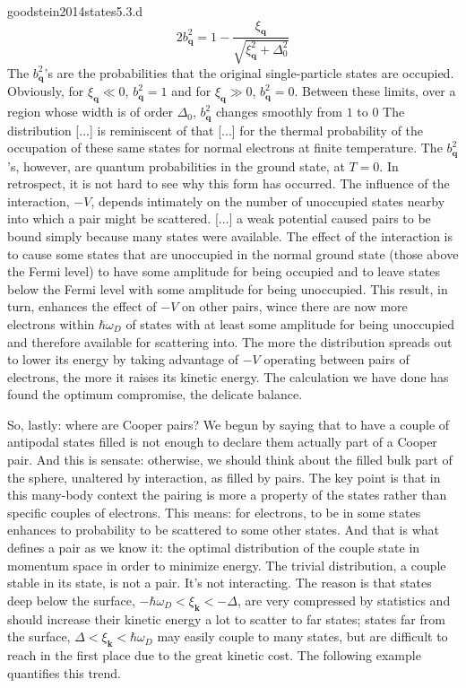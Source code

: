 \begin{cit}{goodstein2014states}{5.3.d}
	\[
	2 b_\mathbf{q}^2 = 1 - \frac{\xi_\mathbf{q}}{\sqrt{\xi_\mathbf{q}^2 + \Delta_0^2}}
	\]
	The $b_\mathbf{q}^2$'s are the probabilities that the original single-particle states are occupied. Obviously, for $\xi_\mathbf{q} \ll 0$, $b_\mathbf{q}^2 = 1$ and for $\xi_\mathbf{q} \gg 0$, $b_\mathbf{q}^2 = 0$. Between these limits, over a region whose width is of order $\Delta_0$, $b_\mathbf{q}^2$ changes smoothly from $1$ to $0$ The distribution [...] is reminiscent of that [...] for the thermal probability of the occupation of these same states for normal electrons at finite temperature. The $b_\mathbf{q}^2$'s, however, are quantum probabilities in the ground state, at $T=0$. In retrospect, it is not hard to see why this form has occurred. The influence of the interaction, $-V$, depends intimately on the number of unoccupied states nearby into which a pair might be scattered. [...] a weak potential caused pairs to be bound simply because many states were available. The effect of the interaction is to cause some states that are unoccupied in the normal ground state (those above the Fermi level) to have some amplitude for being occupied and to leave states below the Fermi level with some amplitude for being unoccupied. This result, in turn, enhances the effect of $-V$ on other pairs, wince there are now more electrons within $\hbar\omega_D$ of states with at least some amplitude for being unoccupied and therefore available for scattering into. The more the distribution spreads out to lower its energy by taking advantage of $-V$ operating between pairs of electrons, the more it raises its kinetic energy. The calculation we have done has found the optimum compromise, the delicate balance.
\end{cit}

So, lastly: where are Cooper pairs? We begun by saying that to have a couple of antipodal states filled is not enough to declare them actually part of a Cooper pair. And this is sensate: otherwise, we should think about the filled bulk part of the sphere, unaltered by interaction, as filled by pairs. The key point is that in this many-body context the pairing is more a property of the states rather than specific couples of electrons. This means: for electrons, to be in some states enhances to probability to be scattered to some other states. And that is what defines a pair as we know it: the optimal distribution of the couple state in momentum space in order to minimize energy. The trivial distribution, a couple stable in its state, is not a pair. It's not interacting. The reason is that states deep below the surface, $-\hbar\omega_D < \xi_\mathbf{k} < -\Delta$, are very compressed by statistics and should increase their kinetic energy a lot to scatter to far states; states far from the surface, $\Delta < \xi_\mathbf{k} < \hbar\omega_D$ may easily couple to many states, but are difficult to reach in the first place due to the great kinetic cost. The following example quantifies this trend.

